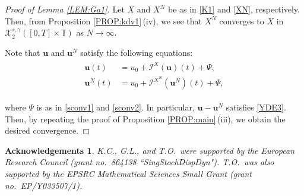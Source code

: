 \documentclass[letterpaper, 11pt,  reqno]{amsart}
\newcommand{\1}{\hspace{0.5mm}\text{I}\hspace{0.5mm}}
\newcommand{\I}{\mathcal{I}}
\newcommand{\noi}{\noindent}
\newcommand{\T}{\mathbb{T}}
\newcommand{\g}{\gamma}
\newcommand{\cX}{\mathcal{X}}
\newcommand{\uu}{\mathbf{u}}
\newtheorem*{ackno}{Acknowledgements}
\numberwithin{equation}{section}
\numberwithin{theorem}{section}
\begin{document}
 
\begin{proof}[Proof of Lemma \ref{LEM:Ga1}]

Let $X$ and $X^N$ be as in 
\eqref{K1} and 
\eqref{XN},   respectively.
Then, 
from Proposition \ref{PROP:kdv1}\,(iv), 
we see that 
$X^N$ converges to  $X$ 
in  $ \cX^{s, \g}_2([0, T]\times \T)$ as $N \to \infty$.

Note that $\uu$ and $\uu^N$ satisfy the following equations:
\begin{align}
\begin{split}
\uu(t) & = u_0 + \I^{X}(\uu)(t) + \Psi, \\
\uu^N(t) & = u_0 + \I^{X^N}(\uu^N)(t) + \Psi, 
\end{split}
\label{YDEX}
\end{align}

\noi
where $\Psi$ is as in \eqref{sconv1} and \eqref{sconv2}.
In particular, $\uu - \uu^N$ satisfies \eqref{YDE3}.
Then, by repeating the proof of 
Proposition \ref{PROP:main}\,(iii), 
we obtain the desired convergence.
\end{proof}
	









\begin{ackno}\rm
K.C., G.L., and T.O.~were supported by the European Research Council (grant no.~864138 ``SingStochDispDyn").
T.O.~was also supported by the EPSRC 
Mathematical Sciences
Small Grant  (grant no.~EP/Y033507/1).


\end{ackno}
\end{document}
